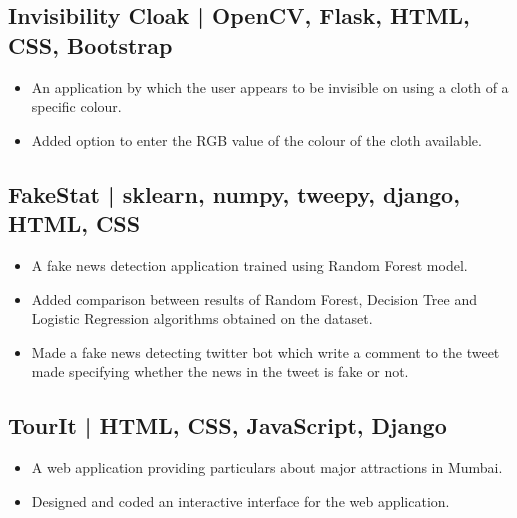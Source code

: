 \documentclass[10pt]{article}
\newenvironment{zitemize}{
\begin{itemize}\itemsep2pt \parskip0pt \parsep1pt}
{\end{itemize}\vspace{-0.5cm}}
\begin{document}


\subsection*{Invisibility Cloak | OpenCV, Flask, HTML, CSS, Bootstrap} 
    \begin{zitemize}
        \item An application by which the user appears to be invisible on using a cloth of a specific colour.
        \item Added option to enter the RGB value of the colour of the cloth available.
    \end{zitemize}


\subsection*{FakeStat | sklearn, numpy, tweepy, django, HTML, CSS } 
    \begin{zitemize}
        \item A fake news detection application trained using Random Forest model.
        \item Added comparison between results of Random Forest, Decision Tree and Logistic Regression algorithms obtained on the dataset.
        \item Made a fake news detecting twitter bot which write a comment to the tweet made specifying whether the news in the tweet is fake or not.
    \end{zitemize}


\subsection*{ TourIt | HTML, CSS, JavaScript, Django} 
    \begin{zitemize}
        \item A  web  application  providing  particulars  about  major attractions in Mumbai.
        \item Designed and coded an interactive interface for the web application.
    \end{zitemize}
\end{document}
